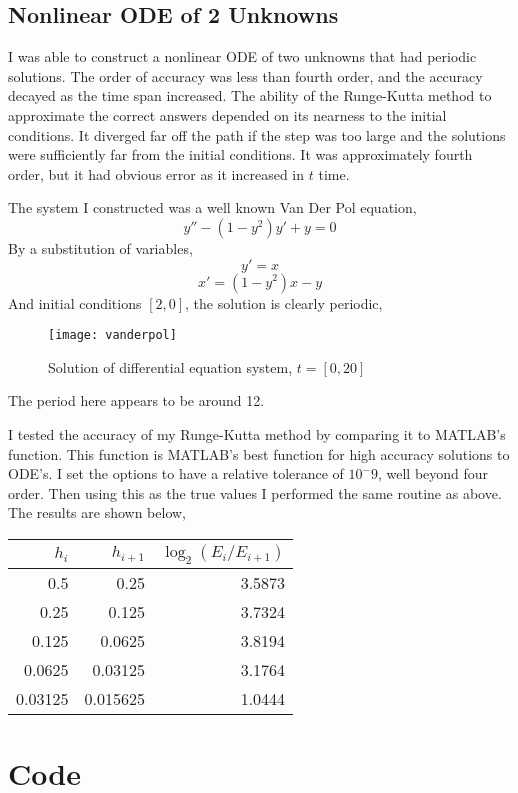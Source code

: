 \documentclass[]{article}
\begin{document}
\subsection*{Nonlinear ODE of 2 Unknowns} I was able to construct a nonlinear ODE of two unknowns that had periodic solutions. The order of accuracy was less than fourth order, and the accuracy decayed as the time span increased. The ability of the Runge-Kutta method to approximate the correct answers depended on its nearness to the initial conditions. It diverged far off the path if the step was too large and the solutions were sufficiently far from the initial conditions. It was approximately fourth order, but it had obvious error as it increased in $ t $ time. 

The system I constructed was a well known Van Der Pol equation, 
\[ y'' - (1 - y^2) y' + y = 0  \]
By a substitution of variables, 
\[ y' = x \]
\[ x' = (1-y^2)x - y \]
And initial conditions $ [2,0] $, the solution is clearly periodic, 
\begin{figure}\centering
	\caption{Solution of differential equation system, $ t = [0,20] $}
\texttt{[image: vanderpol]}
\end{figure}
The period here appears to be around 12.

I  tested the accuracy of my Runge-Kutta method by comparing it to MATLAB's  function. This function is MATLAB's best function for high accuracy solutions to ODE's. I set the  options to have a relative tolerance of $ 10^-9 $, well beyond four order. Then using this as the true values I performed the same routine as above. The results are shown below, 

\begin{table}[H]
	\centering
	\begin{tabular}{rrr}
		$ h_i $ & $ h_{i+1} $ & $ \log_2(E_i/E_{i+1}) $\\
		\hline 
		\hline 
		0.5 & 0.25 & 3.5873\\
		0.25 & 0.125 & 3.7324\\
		0.125 & 0.0625 & 3.8194\\ 
		0.0625 &  0.03125 & 3.1764 \\
		0.03125 & 0.015625 &  1.0444\\
	\end{tabular}
\end{table}
	
\appendix
\section{Code}	
	
	
	
	
	
	
\end{document}

